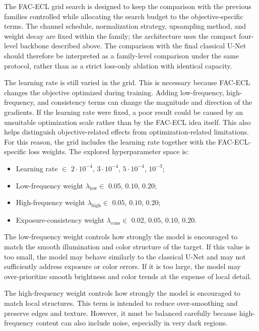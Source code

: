 The FAC-ECL grid search is designed to keep the comparison with the previous families controlled while allocating the search budget to the objective-specific terms. The channel schedule, normalization strategy, upsampling method, and weight decay are fixed within the family; the architecture uses the compact four-level backbone described above. The comparison with the final classical U-Net should therefore be interpreted as a family-level comparison under the same protocol, rather than as a strict loss-only ablation with identical capacity.

The learning rate is still varied in the grid. This is necessary because FAC-ECL changes the objective optimized during training. Adding low-frequency, high-frequency, and consistency terms can change the magnitude and direction of the gradients. If the learning rate were fixed, a poor result could be caused by an unsuitable optimization scale rather than by the FAC-ECL idea itself. This also helps distinguish objective-related effects from optimization-related limitations. For this reason, the grid includes the learning rate together with the FAC-ECL-specific loss weights. The explored hyperparameter space is:

\begin{itemize}[topsep=5pt]
	\item Learning rate $\in$ $2{\cdot}10^{-4}$, $3{\cdot}10^{-4}$, $5{\cdot}10^{-4}$, $10^{-3}$;
	\item Low-frequency weight $\lambda_{\mathrm{low}} \in$ $0.05$, $0.10$, $0.20$;
	\item High-frequency weight $\lambda_{\mathrm{high}} \in$ $0.05$, $0.10$, $0.20$;
	\item Exposure-consistency weight $\lambda_{\mathrm{cons}} \in$ $0.02$, $0.05$, $0.10$, $0.20$.
\end{itemize}

The low-frequency weight controls how strongly the model is encouraged to match the smooth illumination and color structure of the target. If this value is too small, the model may behave similarly to the classical U-Net and may not sufficiently address exposure or color errors. If it is too large, the model may over-prioritize smooth brightness and color trends at the expense of local detail.

The high-frequency weight controls how strongly the model is encouraged to match local structures. This term is intended to reduce over-smoothing and preserve edges and texture. However, it must be balanced carefully because high-frequency content can also include noise, especially in very dark regions.

